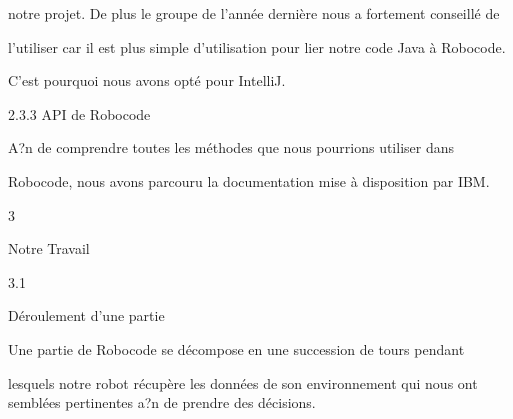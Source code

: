\documentclass[a4paper,portrait,12pt]{article}
\begin{document}
\begin{flushleft}
notre projet. De plus le groupe de l'ann\'{e}e derni\`{e}re nous a fortement conseill\'{e} de
\end{flushleft}


\begin{flushleft}
l'utiliser car il est plus simple d'utilisation pour lier notre code Java \`{a} Robocode.
\end{flushleft}


\begin{flushleft}
C'est pourquoi nous avons opt\'{e} pour IntelliJ.
\end{flushleft}





\begin{flushleft}
2.3.3 API de Robocode
\end{flushleft}


\begin{flushleft}
A?n de comprendre toutes les m\'{e}thodes que nous pourrions utiliser dans
\end{flushleft}


\begin{flushleft}
Robocode, nous avons parcouru la documentation mise \`{a} disposition par IBM.
\end{flushleft}





3





\begin{flushleft}
Notre Travail
\end{flushleft}





3.1





\begin{flushleft}
D\'{e}roulement d'une partie
\end{flushleft}





\begin{flushleft}
Une partie de Robocode se d\'{e}compose en une succession de tours pendant
\end{flushleft}


\begin{flushleft}
lesquels notre robot r\'{e}cup\`{e}re les donn\'{e}es de son environnement qui nous ont sembl\'{e}es pertinentes a?n de prendre des d\'{e}cisions.
\end{flushleft}
\end{document}
